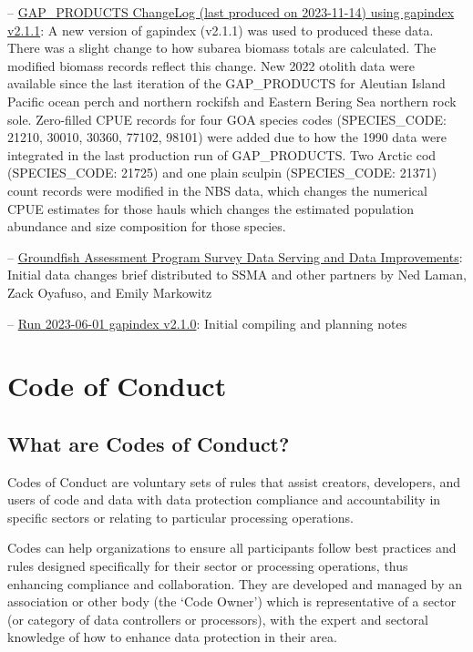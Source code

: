 \documentclass[
  letterpaper,
  oneside,
  open=any]{scrbook}
\begin{document}
--
\href{https://raw.githubusercontent.com/afsc-gap-products/gap_products/main/content/intro-news/2023-11-14_v2-1-1.txt}{GAP\_PRODUCTS
ChangeLog (last produced on 2023-11-14) using gapindex v2.1.1}: A new
version of gapindex (v2.1.1) was used to produced these data. There was
a slight change to how subarea biomass totals are calculated. The
modified biomass records reflect this change. New 2022 otolith data were
available since the last iteration of the GAP\_PRODUCTS for Aleutian
Island Pacific ocean perch and northern rockifsh and Eastern Bering Sea
northern rock sole. Zero-filled CPUE records for four GOA species codes
(SPECIES\_CODE: 21210, 30010, 30360, 77102, 98101) were added due to how
the 1990 data were integrated in the last production run of
GAP\_PRODUCTS. Two Arctic cod (SPECIES\_CODE: 21725) and one plain
sculpin (SPECIES\_CODE: 21371) count records were modified in the NBS
data, which changes the numerical CPUE estimates for those hauls which
changes the estimated population abundance and size composition for
those species.

--
\href{https://raw.githubusercontent.com/afsc-gap-products/gap_products/main/content/intro-news/2023-06-20_datachangesbreif}{Groundfish
Assessment Program Survey Data Serving and Data Improvements}: Initial
data changes brief distributed to SSMA and other partners by Ned Laman,
Zack Oyafuso, and Emily Markowitz

--
\href{https://raw.githubusercontent.com/afsc-gap-products/gap_products/main/content/intro-news/2023-06-01_v2-1-0.txt}{Run
2023-06-01 gapindex v2.1.0}: Initial compiling and planning notes

\hypertarget{code-of-conduct}{%
\chapter{Code of Conduct}\label{code-of-conduct}}

\hypertarget{what-are-codes-of-conduct}{%
\section{What are Codes of Conduct?}\label{what-are-codes-of-conduct}}

Codes of Conduct are voluntary sets of rules that assist creators,
developers, and users of code and data with data protection compliance
and accountability in specific sectors or relating to particular
processing operations.

Codes can help organizations to ensure all participants follow best
practices and rules designed specifically for their sector or processing
operations, thus enhancing compliance and collaboration. They are
developed and managed by an association or other body (the `Code Owner')
which is representative of a sector (or category of data controllers or
processors), with the expert and sectoral knowledge of how to enhance
data protection in their area.
\end{document}
